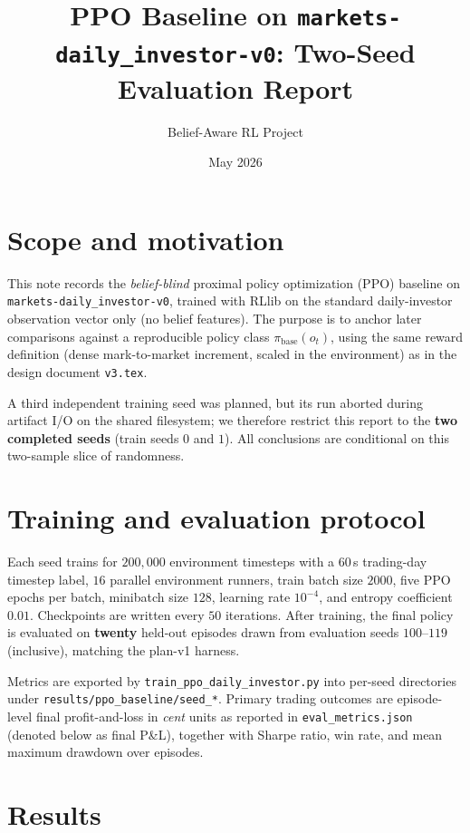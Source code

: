 \documentclass[11pt]{article}
\title{PPO Baseline on \texttt{markets-daily\_investor-v0}: Two-Seed Evaluation Report}
\author{Belief-Aware RL Project}
\date{May 2026}
\begin{document}
\maketitle

\section{Scope and motivation}

This note records the \emph{belief-blind} proximal policy optimization (PPO) baseline on
\texttt{markets-daily\_investor-v0}, trained with RLlib on the standard daily-investor observation
vector only (no belief features). The purpose is to anchor later comparisons against a reproducible
policy class $\pi_{\text{base}}(o_t)$, using the same reward definition (dense mark-to-market
increment, scaled in the environment) as in the design document \texttt{v3.tex}.

A third independent training seed was planned, but its run aborted during artifact I/O on the
shared filesystem; we therefore restrict this report to the \textbf{two completed seeds} (train
seeds $0$ and $1$). All conclusions are conditional on this two-sample slice of randomness.

\section{Training and evaluation protocol}

Each seed trains for $200{,}000$ environment timesteps with a $60$\,s trading-day timestep label,
$16$ parallel environment runners, train batch size $2000$, five PPO epochs per batch, minibatch
size $128$, learning rate $10^{-4}$, and entropy coefficient $0.01$. Checkpoints are written every
$50$ iterations. After training, the final policy is evaluated on \textbf{twenty} held-out
episodes drawn from evaluation seeds $100$--$119$ (inclusive), matching the plan-v1 harness.

Metrics are exported by \texttt{train\_ppo\_daily\_investor.py} into per-seed directories under
\texttt{results/ppo\_baseline/seed\_*}. Primary trading outcomes are episode-level final
profit-and-loss in \emph{cent} units as reported in \texttt{eval\_metrics.json} (denoted below as
final P\&L), together with Sharpe ratio, win rate, and mean maximum drawdown over episodes.

\section{Results}
\end{document}
